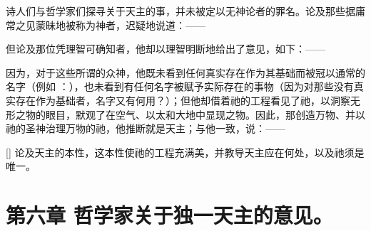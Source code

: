 诗人们与哲学家们探寻关于天主的事，并未被定以无神论者的罪名。论及那些据庸常之见蒙昧地被称为神者，迟疑地说道：——\par

\par

但论及那位凭理智可确知者，他却以理智明断地给出了意见，如下：——\par

\par

因为，对于这些所谓的众神，他既未看到任何真实存在作为其基础而被冠以通常的名字（例如 ：），也未看到有任何名字被赋予实际存在的事物（因为对那些没有真实存在作为基础者，名字又有何用？）；但他却借着祂的工程看见了祂，以洞察无形之物的眼目，默观了在空气、以太和大地中显现之物。因此，那创造万物、并以祂的圣神治理万物的祂，他推断就是天主；与他一致，说：——\par

\par

[] 论及天主的本性，这本性使祂的工程充满美，并教导天主应在何处，以及祂须是唯一。\par


\section{第六章 哲学家关于独一天主的意见。}

